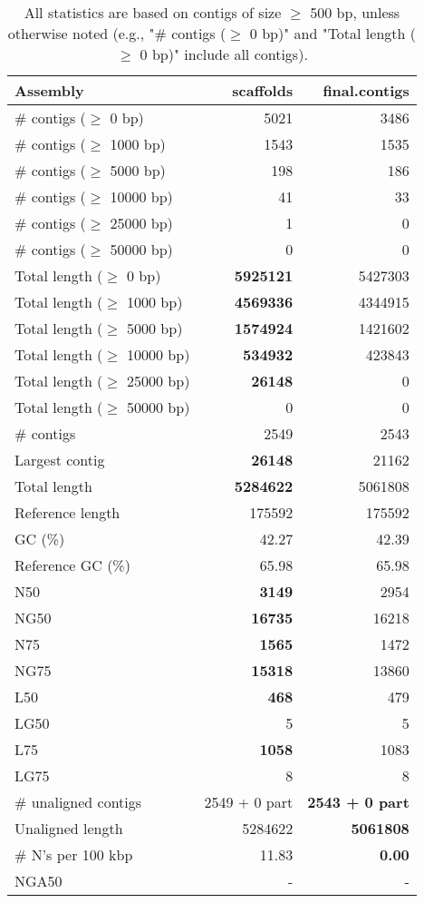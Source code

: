 \documentclass[12pt,a4paper]{article}
\begin{document}
\begin{table}[ht]
\begin{center}
\caption{All statistics are based on contigs of size $\geq$ 500 bp, unless otherwise noted (e.g., "\# contigs ($\geq$ 0 bp)" and "Total length ($\geq$ 0 bp)" include all contigs).}
\begin{tabular}{|l*{2}{|r}|}
\hline
Assembly & scaffolds & final.contigs \\ \hline
\# contigs ($\geq$ 0 bp) & 5021 & 3486 \\ \hline
\# contigs ($\geq$ 1000 bp) & 1543 & 1535 \\ \hline
\# contigs ($\geq$ 5000 bp) & 198 & 186 \\ \hline
\# contigs ($\geq$ 10000 bp) & 41 & 33 \\ \hline
\# contigs ($\geq$ 25000 bp) & 1 & 0 \\ \hline
\# contigs ($\geq$ 50000 bp) & 0 & 0 \\ \hline
Total length ($\geq$ 0 bp) & {\bf 5925121} & 5427303 \\ \hline
Total length ($\geq$ 1000 bp) & {\bf 4569336} & 4344915 \\ \hline
Total length ($\geq$ 5000 bp) & {\bf 1574924} & 1421602 \\ \hline
Total length ($\geq$ 10000 bp) & {\bf 534932} & 423843 \\ \hline
Total length ($\geq$ 25000 bp) & {\bf 26148} & 0 \\ \hline
Total length ($\geq$ 50000 bp) & 0 & 0 \\ \hline
\# contigs & 2549 & 2543 \\ \hline
Largest contig & {\bf 26148} & 21162 \\ \hline
Total length & {\bf 5284622} & 5061808 \\ \hline
Reference length & 175592 & 175592 \\ \hline
GC (\%) & 42.27 & 42.39 \\ \hline
Reference GC (\%) & 65.98 & 65.98 \\ \hline
N50 & {\bf 3149} & 2954 \\ \hline
NG50 & {\bf 16735} & 16218 \\ \hline
N75 & {\bf 1565} & 1472 \\ \hline
NG75 & {\bf 15318} & 13860 \\ \hline
L50 & {\bf 468} & 479 \\ \hline
LG50 & 5 & 5 \\ \hline
L75 & {\bf 1058} & 1083 \\ \hline
LG75 & 8 & 8 \\ \hline
\# unaligned contigs & 2549 + 0 part & {\bf 2543 + 0 part} \\ \hline
Unaligned length & 5284622 & {\bf 5061808} \\ \hline
\# N's per 100 kbp & 11.83 & {\bf 0.00} \\ \hline
NGA50 & - & - \\ \hline
\end{tabular}
\end{center}
\end{table}
\end{document}
